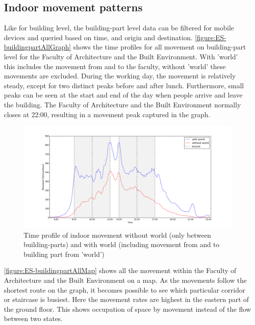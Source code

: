 \subsection{Indoor movement patterns}\label{ES-indoorMovement}
Like for building level, the building-part level data can be filtered for mobile devices and queried based on time, and origin and destination. \autoref{figure:ES-buildingpartAllGraph} shows the time profiles for all movement on building-part level for the Faculty of Architecture and the Built Environment. With 'world' this includes the movement from and to the faculty, without 'world' these movements are excluded. During the working day, the movement is relatively steady, except for two distinct peaks before and after lunch. Furthermore, small peaks can be seen at the start and end of the day when people arrive and leave the building. The Faculty of Architecture and the Built Environment normally closes at 22:00, resulting in a movement peak captured in the graph. 

\begin{figure}[H]
\centering
\includegraphics[scale=0.2]{buildingpart_all_graph.png}
\captionsetup{justification=centering}
\caption{Time profile of indoor movement without world (only between building-parts) and with world (including movement from and to building part from 'world')}
\label{figure:ES-buildingpartAllGraph}
\end{figure}

\autoref{figure:ES-buildingpartAllMap} shows all the movement within the Faculty of Architecture and the Built Environment on a map. As the movements follow the shortest route on the graph, it becomes possible to see which particular corridor or staircase is busiest. Here the movement rates are highest in the eastern part of the ground floor. This shows occupation of space by movement instead of the flow between two states.


